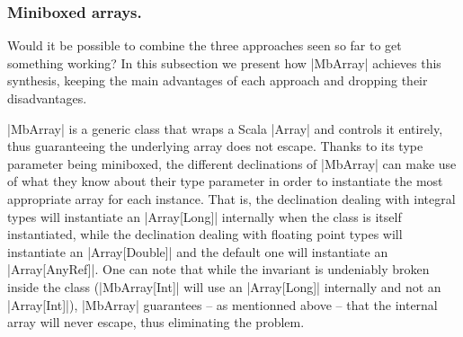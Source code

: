 \subsubsection{Miniboxed arrays.}


Would it be possible to combine the three approaches seen so far to get something working? In this subsection we present how |MbArray| achieves this synthesis, keeping the main advantages of each approach and dropping their disadvantages. 





|MbArray| is a generic class that wraps a Scala |Array| and controls it entirely, thus guaranteeing the underlying array does not escape. Thanks to its type parameter being miniboxed, the different declinations of |MbArray| can make use of what they know about their type parameter in order to instantiate the most appropriate array for each instance. That is, the declination dealing with integral types will instantiate an |Array[Long]| internally when the class is itself instantiated, while the declination dealing with floating point types will instantiate an |Array[Double]| and the default one will instantiate an |Array[AnyRef]|. One can note that while the invariant is undeniably broken inside the class (|MbArray[Int]| will use an |Array[Long]| internally and not an |Array[Int]|), |MbArray| guarantees -- as mentionned above -- that the internal array will never escape, thus eliminating the problem. 

